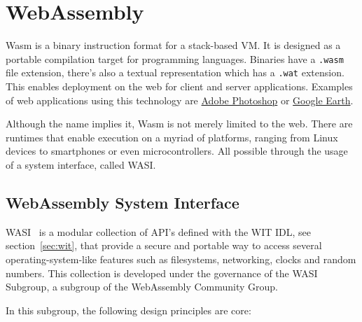 \chapter{WebAssembly}
\label{chap:wasm}

\gls{Wasm} is a binary instruction format for a stack-based \gls{VM}. It is designed as a portable compilation target for programming languages. Binaries have a \texttt{.wasm} file extension, there's also a textual representation which has a \texttt{.wat} extension. This enables deployment on the web for client and server applications. Examples of web applications using this technology are \href{https://photoshop.adobe.com/}{Adobe Photoshop} or \href{https://earth.google.com/web}{Google Earth}.

Although the name implies it, \gls{Wasm} is not merely limited to the web. There are runtimes that enable execution on a myriad of platforms, ranging from Linux devices to smartphones or even microcontrollers. All possible through the usage of a system interface, called \gls{WASI}.

\section{WebAssembly System Interface}
\label{sec:wasi}

\gls{WASI}~\cite{wasi} is a modular collection of \gls{API}'s defined with the \gls{WIT} IDL, see section~\ref{sec:wit}, that provide a secure and portable way to access several operating-system-like features such as filesystems, networking, clocks and random numbers. This collection is developed under the governance of the \gls{WASI} Subgroup, a subgroup of the WebAssembly Community Group.

In this subgroup, the following design principles are core:

